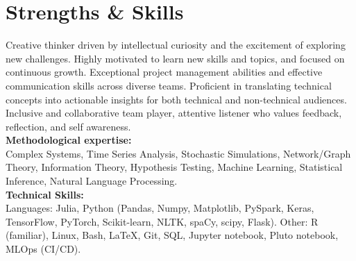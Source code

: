 \documentclass[a4paper,5pt]{article}
\begin{document}
\section{Strengths \& Skills}
Creative thinker driven by intellectual curiosity and the excitement of exploring new challenges. Highly motivated to learn new skills and topics, and focused on continuous growth. Exceptional project management abilities and effective communication skills across diverse teams. Proficient in translating technical concepts into actionable insights for both technical and non-technical audiences. Inclusive and collaborative team player, attentive listener who values feedback, reflection, and self awareness.  
\\
{\bf Methodological expertise:}\\
Complex Systems, Time Series Analysis, Stochastic Simulations, Network/Graph Theory, Information Theory, Hypothesis Testing, Machine Learning, Statistical Inference, Natural Language Processing.
\\
{\bf Technical Skills:}\\
Languages: Julia, Python (Pandas, Numpy, Matplotlib, PySpark, Keras, TensorFlow, PyTorch, Scikit-learn, NLTK, spaCy, scipy, Flask). Other: R (familiar), Linux, Bash, LaTeX, Git, SQL, Jupyter notebook, Pluto notebook, MLOps (CI/CD).
\end{document}
